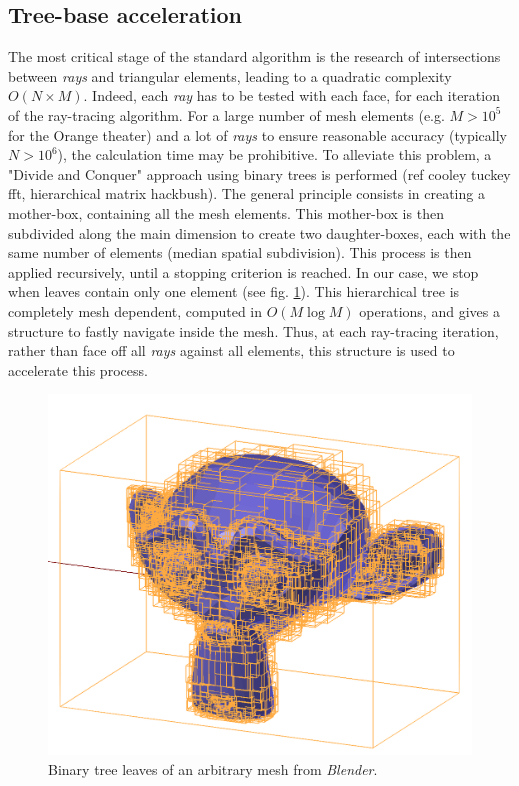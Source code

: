 \documentclass[AMA,STIX1COL]{WileyNJD-v2}
\begin{document}
\subsection{Tree-base acceleration}
\label{octree}
The most critical stage of the standard algorithm is the research of intersections between  \textit{rays} and triangular elements, leading to a quadratic complexity $O(N\times M)$. Indeed, each \textit{ray} has to be tested with each face, for each iteration of the ray-tracing algorithm. For a large number of mesh elements (e.g. $M>10^5$ for the Orange theater) and a lot of \textit{rays} to ensure reasonable accuracy (typically $N>10^6$), the calculation time may be prohibitive. To alleviate this problem, a "Divide and Conquer" approach using binary trees is performed (ref cooley tuckey fft, hierarchical matrix hackbush). The general principle consists in creating a mother-box, containing all the mesh elements. This mother-box is then subdivided along the main dimension to create two daughter-boxes, each with the same number of elements (median spatial subdivision). This process is then applied recursively, until a stopping criterion is reached. In our case, we stop when leaves contain only one element (see fig. \ref{octreeSuzanne}). This hierarchical tree is completely mesh dependent, computed in $O(M\log M)$ operations, and gives a structure to fastly navigate inside the mesh. Thus, at each ray-tracing iteration, rather than face off all \textit{rays} against all elements, this structure is used to accelerate this process. 

\begin{figure}[t]
\centering
		\includegraphics[width=0.4\linewidth]{octreeSuzanne}
		\caption{Binary tree leaves of an arbitrary mesh from \textit{Blender}.}
		\label{octreeSuzanne}
\end{figure}
\end{document}
